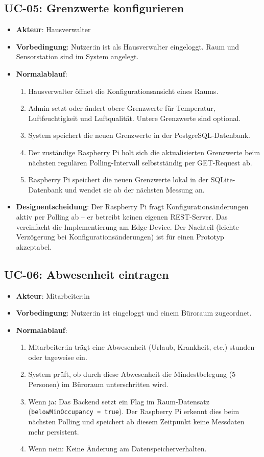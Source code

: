 \documentclass[12pt,a4paper]{article}
\begin{document}
\subsection{UC-05: Grenzwerte konfigurieren}
\begin{itemize}
	\item \textbf{Akteur}: Hausverwalter
	\item \textbf{Vorbedingung}: Nutzer:in ist als Hausverwalter eingeloggt. Raum und Sensorstation sind im System angelegt.
	\item \textbf{Normalablauf}:
	\begin{enumerate}
		\item Hausverwalter öffnet die Konfigurationsansicht eines Raums.
		\item Admin setzt oder ändert obere Grenzwerte für Temperatur, Luftfeuchtigkeit und Luftqualität. Untere Grenzwerte sind optional.
		\item System speichert die neuen Grenzwerte in der PostgreSQL-Datenbank.
		\item Der zuständige Raspberry Pi holt sich die aktualisierten Grenzwerte beim nächsten regulären Polling-Intervall selbstständig per GET-Request ab.
		\item Raspberry Pi speichert die neuen Grenzwerte lokal in der SQLite-Datenbank und wendet sie ab der nächsten Messung an.
	\end{enumerate}
	\item \textbf{Designentscheidung}: Der Raspberry Pi fragt Konfigurationsänderungen aktiv per Polling ab -- er betreibt keinen eigenen REST-Server. Das vereinfacht die Implementierung am Edge-Device. Der Nachteil (leichte Verzögerung bei Konfigurationsänderungen) ist für einen Prototyp akzeptabel.
\end{itemize}

\subsection{UC-06: Abwesenheit eintragen}
\begin{itemize}
	\item \textbf{Akteur}: Mitarbeiter:in
	\item \textbf{Vorbedingung}: Nutzer:in ist eingeloggt und einem Büroraum zugeordnet.
	\item \textbf{Normalablauf}:
	\begin{enumerate}
		\item Mitarbeiter:in trägt eine Abwesenheit (Urlaub, Krankheit, etc.) stunden- oder tageweise ein.
		\item System prüft, ob durch diese Abwesenheit die Mindestbelegung (5 Personen) im Büroraum unterschritten wird.
		\item Wenn ja: Das Backend setzt ein Flag im Raum-Datensatz (\texttt{belowMinOccupancy = true}). Der Raspberry Pi erkennt dies beim nächsten Polling und speichert ab diesem Zeitpunkt keine Messdaten mehr persistent.
		\item Wenn nein: Keine Änderung am Datenspeicherverhalten.
	\end{enumerate}
\end{itemize}
\end{document}
